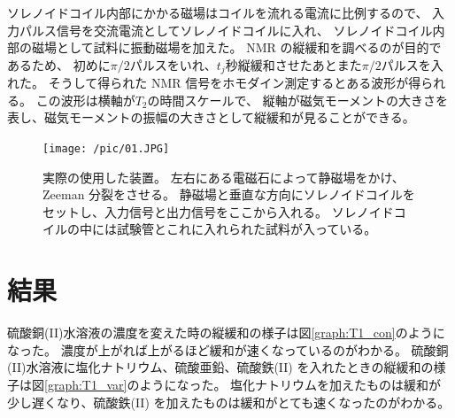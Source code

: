 \documentclass[11pt,dvipdfmx,a4paper]{jsarticle}
\begin{document}
ソレノイドコイル内部にかかる磁場はコイルを流れる電流に比例するので、
入力パルス信号を交流電流としてソレノイドコイルに入れ、
ソレノイドコイル内部の磁場として試料に振動磁場を加えた。
NMR の縦緩和を調べるのが目的であるため、
初めに\(\pi/2\)パルスをいれ、\(t_j\)秒縦緩和させたあとまた\(\pi/2\)パルスを入れた。
そうして得られた NMR 信号をホモダイン測定するとある波形が得られる。
この波形は横軸が\(T_2\)の時間スケールで、
縦軸が磁気モーメントの大きさを表し、磁気モーメントの振幅の大きさとして縦緩和が見ることができる。
\begin{figure}[H]
	\centering
	\texttt{[image: /pic/01.JPG]}
	\caption{実際の使用した装置。
	左右にある電磁石によって静磁場をかけ、Zeeman 分裂をさせる。
	静磁場と垂直な方向にソレノイドコイルをセットし、入力信号と出力信号をここから入れる。
	ソレノイドコイルの中には試験管とこれに入れられた試料が入っている。}
	\label{pic:machine}
\end{figure}

\clearpage

\section{結果}

硫酸銅(II)水溶液の濃度を変えた時の縦緩和の様子は図\ref{graph:T1_con}のようになった。
濃度が上がれば上がるほど緩和が速くなっているのがわかる。
硫酸銅(II)水溶液に塩化ナトリウム、硫酸亜鉛、硫酸鉄(II) を入れたときの縦緩和の様子は図\ref{graph:T1_var}のようになった。
塩化ナトリウムを加えたものは緩和が少し遅くなり、硫酸鉄(II) を加えたものは緩和がとても速くなったのがわかる。
\end{document}
